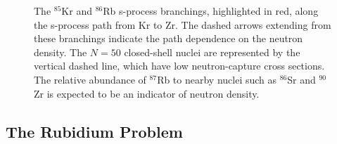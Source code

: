 \begin{figure}[!h]
\caption{\label{fig:Rb86Branch}The $^{85}$Kr and $^{86}$Rb s-process branchings, highlighted in red, along the s-process path from Kr to Zr. The dashed arrows extending from these branchings indicate the path dependence on the neutron density. The $N=50$ closed-shell nuclei are represented by the vertical dashed line, which have low neutron-capture cross sections. The relative abundance of $^{87}$Rb to nearby nuclei such as $^{86}$Sr and $^{90}$Zr is expected to be an indicator of neutron density.}
\end{figure}

\subsection{The Rubidium Problem} \label{subsec:Rb_Problem}


